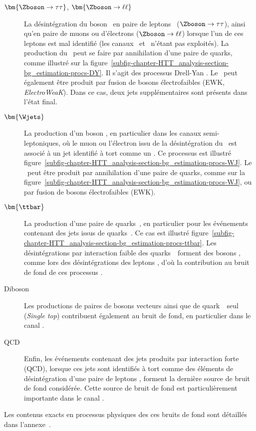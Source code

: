 \begin{description}
\item[$\bm{\Zboson\to\tau\tau}$, $\bm{\Zboson\to\ell\ell}$] La désintégration du boson \Zboson\ en paire de leptons \tau\ ($\Zboson\to\tau\tau$),
ainsi qu'en paire de muons ou d'électrons ($\Zboson\to\ell\ell$) lorsque l'un de ces leptons est mal identifié (les canaux \mu\mu\ et \ele\ele\ n'étant pas exploités).
La production du \Zboson\ peut se faire par annihilation d'une paire de quarks, comme illustré sur la figure~\ref{subfig-chapter-HTT_analysis-section-bg_estimation-procs-DY}.
Il s'agit des processus \og Drell-Yan \fg.
Le \Zboson\ peut également être produit par fusion de bosons électrofaibles (EWK, \emph{ElectroWeaK}).
Dans ce cas, deux jets supplémentaires sont présents dans l'état final.
\item[$\bm{\Wjets}$] La production d'un boson \Wboson, en particulier dans les canaux semi-leptoniques, où le muon ou l'électron issu de la désintégration du \Wboson\ est associé à un jet identifié à tort comme un \tauh.
Ce processus est illustré figure~\ref{subfig-chapter-HTT_analysis-section-bg_estimation-procs-WJ}.
Le \Wboson\ peut être produit par annihilation d'une paire de quarks, comme sur la figure~\ref{subfig-chapter-HTT_analysis-section-bg_estimation-procs-WJ}, ou par fusion de bosons électrofaibles (EWK).
\item[$\bm{\ttbar}$] La production d'une paire de quarks~\quarkt, en particulier pour les événements contenant des jets issus de quarks~\quarkb.
Ce cas est illustré figure~\ref{subfig-chapter-HTT_analysis-section-bg_estimation-procs-ttbar}.
Les désintégrations par interaction faible des quarks~\quarkt\ forment des bosons \Wboson, comme lors des désintégrations des leptons \tau, d'où la contribution au bruit de fond de ces processus \ttbar.
\item[Diboson] Les productions de paires de bosons vecteurs ainsi que de quark~\quarkt\ seul (\emph{Single top}) contribuent également au bruit de fond, en particulier dans le canal \ele\mu.
\item[QCD] Enfin, les événements contenant des jets produits par interaction forte (QCD), lorsque ces jets sont identifiés à tort comme des éléments de désintégration d'une paire de leptons \tau, forment la dernière source de bruit de fond considérée.
Cette source de bruit de fond est particulièrement importante dans le canal \tauh\tauh.
\end{description}
Les contenus exacts en processus physiques des ces bruits de fond sont détaillés dans l'annexe~.
